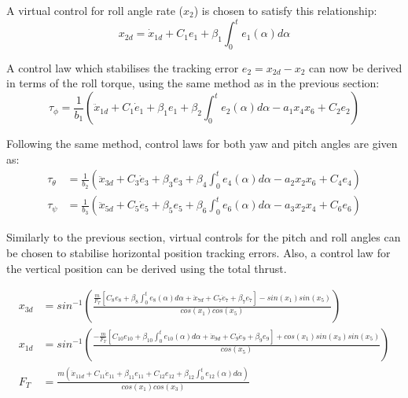A virtual control for roll angle rate ($x_{2}$) is chosen to satisfy this relationship:
\[x_{2d}=\dot{x}_{1d}+C_{1}e_{1}+\beta_{1}\int^{t}_{0} e_{1}(\alpha) d\alpha\]

A control law which stabilises the tracking error $e_{2}=x_{2d}-x_{2}$ can now be derived in terms of the roll torque, using the same method as in the previous section:
\begin{equation}
\tau_{\phi}=\frac{1}{b_{1}} \left( \ddot{x}_{1d}+C_{1}\dot{e}_{1}+\beta_{1}e_{1}+\beta_{2}\int^{t}_{0} e_{2}(\alpha) d\alpha -a_{1}x_{4}x_{6}+C_{2}e_{2}\right)
\end{equation}

Following the same method, control laws for both yaw and pitch angles are given as:
\begin{equation}\label{eqn:IntBackstepAngleLaws}
\begin{split}
\tau_{\theta}&=\frac{1}{b_{2}}\left(\ddot{x}_{3d}+C_{3}\dot{e}_{3}+\beta_{3}e_{3}+\beta_{4}\int^{t}_{0} e_{4}(\alpha) d\alpha -a_{2}x_{2}x_{6}+C_{4}e_{4}\right)\\
\tau_{\psi}&=\frac{1}{b_{3}}\left(\ddot{x}_{5d}+C_{5}\dot{e}_{5}+\beta_{5}e_{5}+\beta_{6}\int^{t}_{0} e_{6}(\alpha) d\alpha -a_{3}x_{2}x_{4}+C_{6}e_{6}\right)
\end{split}
\end{equation}

Similarly to the previous section, virtual controls for the pitch and roll angles can be chosen to stabilise horizontal position tracking errors. Also, a control law for the vertical position can be derived using the total thrust.


\begin{equation}\label{eqn:IntBackPosContLaw}
\begin{split}
x_{3d}&=sin^{-1}\left(\frac{\frac{m}{F_{T}}[C_{8}e_{8}+\beta_{8}\int^{t}_{0} e_{8}(\alpha) d\alpha + \ddot{x}_{7d}+C_{7}\dot{e}_{7}+\beta_{7}e_{7}]-sin(x_{1})sin(x_{5})}{cos(x_{1})cos(x_{5})}\right)\\
x_{1d}&=sin^{-1}\left(\frac{-\frac{m}{F_{T}}[C_{10}e_{10}+\beta_{10}\int^{t}_{0} e_{10}(\alpha) d\alpha +\ddot{x}_{9d}+C_{9}\dot{e}_{9}+\beta_{9}e_{9}]+cos(x_{1})sin(x_{3})sin(x_{5})}{cos(x_{5})}\right)\\
F_{T}&=\frac{m\left(\ddot{x}_{11d}+C_{11}\dot{e}_{11}+\beta_{11}e_{11}+C_{12}e_{12}+\beta_{12}\int^{t}_{0} e_{12}(\alpha) d\alpha \right)}{cos(x_{1})cos(x_{3})}
\end{split}
\end{equation}


